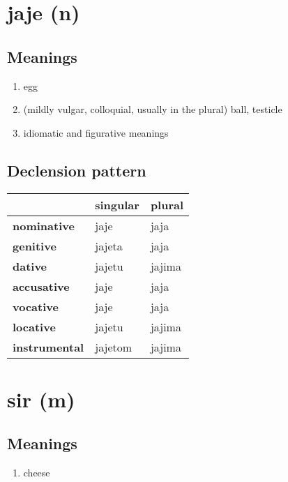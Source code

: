 \filbreak
\section{jaje (n)}
\subsection*{Meanings}
\begin{enumerate}
\item egg
\item (mildly vulgar, colloquial, usually in the plural) ball, testicle
\item idiomatic and figurative meanings
\end{enumerate}
\subsection*{Declension pattern}
\begin{tabularx}{\linewidth}{Xll}
\toprule
{} & singular &  plural \\
\midrule
\textbf{nominative  } &     jaje &    jaja \\
\textbf{genitive    } &   jajeta &    jaja \\
\textbf{dative      } &   jajetu &  jajima \\
\textbf{accusative  } &     jaje &    jaja \\
\textbf{vocative    } &     jaje &    jaja \\
\textbf{locative    } &   jajetu &  jajima \\
\textbf{instrumental} &  jajetom &  jajima \\
\bottomrule
\end{tabularx}

\filbreak
\section{sir (m)}
\subsection*{Meanings}
\begin{enumerate}
\item cheese
\end{enumerate}
